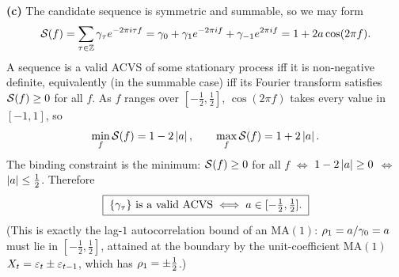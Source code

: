 \documentclass[11pt]{article}
\begin{document}
\textbf{(c)} The candidate sequence is symmetric and summable, so we may form
\[
\mathcal{S}(f)=\sum_{\tau\in\mathbb{Z}}\gamma_\tau e^{-2\pi i\tau f}
=\gamma_0+\gamma_1 e^{-2\pi i f}+\gamma_{-1}e^{2\pi i f}
=1+2a\cos(2\pi f).
\]
A sequence is a valid ACVS of some stationary process iff it is non-negative definite, equivalently (in the summable case) iff its Fourier transform satisfies $\mathcal{S}(f)\ge0$ for all $f$. As $f$ ranges over $[-\tfrac12,\tfrac12]$, $\cos(2\pi f)$ takes every value in $[-1,1]$, so
\[
\min_f \mathcal{S}(f)=1-2\left\lvert a \right\rvert,\qquad \max_f\mathcal{S}(f)=1+2\left\lvert a \right\rvert .
\]
The binding constraint is the minimum: $\mathcal{S}(f)\ge0$ for all $f$ $\iff$ $1-2\left\lvert a \right\rvert\ge0$ $\iff$ $\left\lvert a \right\rvert\le\tfrac12$. Therefore
\[
\boxed{\;\{\gamma_\tau\}\ \text{is a valid ACVS}\iff a\in[-\tfrac12,\tfrac12].\;}
\]
(This is exactly the lag-$1$ autocorrelation bound of an $\mathrm{MA}(1)$: $\rho_1=a/\gamma_0=a$ must lie in $[-\tfrac12,\tfrac12]$, attained at the boundary by the unit-coefficient $\mathrm{MA}(1)$ $X_t=\varepsilon_t\pm\varepsilon_{t-1}$, which has $\rho_1=\pm\tfrac12$.)
\end{document}
